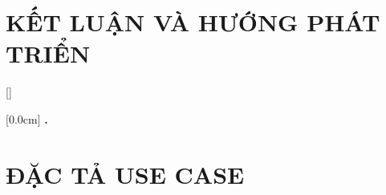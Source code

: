 \documentclass[a4paper,13pt,3p,twoside]{report}
\renewcommand{\bibname}{Danh_sach_tai_lieu_tham_khao}
\theoremstyle{definition}
\begin{document}
\newpage
\chapter{KẾT LUẬN VÀ HƯỚNG PHÁT TRIỂN} %
\label{chapter:conclusion}


% 


\newpage
\renewcommand\bibname{TÀI LIỆU THAM KHẢO}
\printbibliography
{}

\appendixpage
\appendices
\addappheadtotoc


{}[]
\titlespacing*{\chapter}{0pt}{-20pt}{20pt}

    [0.0cm]             %
    {\bfseries\vspace{0.3cm}}                  %
    {{\bfseries{\scshape} \thecontentslabel.\ }} %
    {}         %
    {\contentspage}         %
% 
\newpage
\chapter{ĐẶC TẢ USE CASE}

\end{document}
